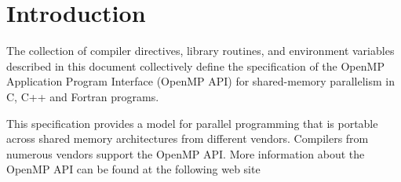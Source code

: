 %
%
%
%
%
%
%
%
%
%

\chapter{Introduction}
\label{chap:introduction}
The collection of compiler directives, library routines, and environment variables 
described in this document collectively define the specification of the OpenMP 
Application Program Interface (OpenMP API) for shared-memory parallelism in C, C++ 
and Fortran programs.

This specification provides a model for parallel programming that is portable across 
shared memory architectures from different vendors. Compilers from numerous vendors 
support the OpenMP API. More information about the OpenMP API can be found at the 
following web site


